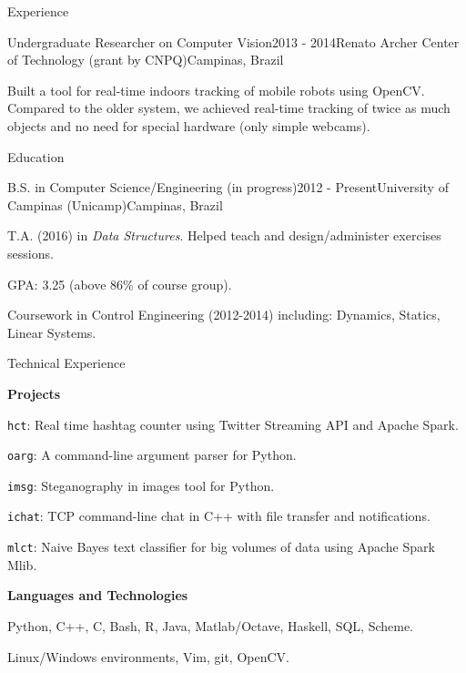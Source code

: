 \documentclass[8pt]{resume}
\newcommand{\tit}[1]{\textit{#1}}
\newcommand{\tbf}[1]{\textbf{#1}}
\newcommand{\ttt}[1]{\texttt{#1}}
\begin{document}
\begin{rSection}{Experience}
\begin{rSubsection}{Undergraduate Researcher on Computer Vision}{2013 - 2014}{Renato Archer Center of Technology (grant by CNPQ)}{Campinas, Brazil}
    \item Built a tool for real-time indoors tracking of
        mobile robots using OpenCV\@. Compared to the older system,
        we achieved real-time tracking of twice as much objects
        and no need for special hardware (only simple webcams).
\end{rSubsection}

\end{rSection}

\begin{rSection}{Education}

    \begin{rSubsection}{B.S. in Computer Science/Engineering (in progress)}{2012 - Present}{University of Campinas (Unicamp)}{Campinas, Brazil}
    \item T.A. (2016) in \tit{Data Structures}. Helped
        teach and design/administer exercises sessions.
    \item GPA: 3.25 (above 86\% of course group).
    \item Coursework in Control Engineering (2012-2014) including:
        Dynamics, Statics, Linear Systems.
\end{rSubsection}

\end{rSection}

\begin{rSection}{Technical Experience}


\tbf{Projects}
\begin{rSubsection}{}{}{}{}
    \item \ttt{hct}: Real time hashtag counter using Twitter Streaming API and
        Apache Spark.
    \item \ttt{oarg}: A command-line argument parser for Python.
    \item \ttt{imsg}: Steganography in images tool for Python.
    \item \ttt{ichat}: TCP command-line chat in C++ with file transfer and
        notifications.
    \item \ttt{mlct}: Naive Bayes text classifier for big volumes of data using
        Apache Spark Mlib.
\end{rSubsection}

\tbf{Languages and Technologies}
\begin{rSubsection}{}{}{}{}
    \item Python, C++, C, Bash, R, Java, Matlab/Octave, Haskell, SQL, Scheme.
    \item Linux/Windows environments, Vim, git, OpenCV.
\end{rSubsection}
\end{rSection}
\end{document}
